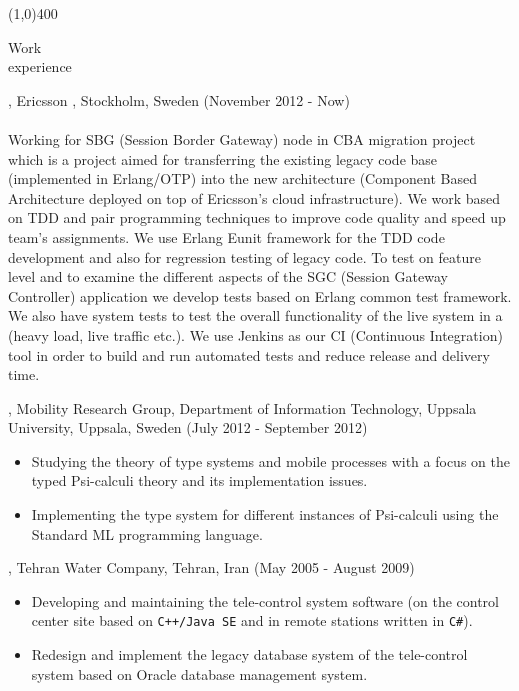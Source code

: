 \documentclass{resume}
\begin{document}
\begin{center}
\line(1,0){400}
\end{center}

\begin{category}{Work \\experience}

, Ericsson , Stockholm, Sweden (November 2012 - Now)\\ \\
Working for SBG (Session Border Gateway) node in CBA migration project which is a project 
aimed for transferring the existing legacy code base (implemented in Erlang/OTP) into the 
new architecture (Component Based Architecture deployed on top of Ericsson's cloud infrastructure). 
We work based on TDD and pair programming techniques to improve code quality and
speed up team's assignments. We use Erlang Eunit framework for the TDD code development and also
for regression testing of legacy code.
To test on feature level and to examine the different aspects of the SGC (Session Gateway Controller) 
application we develop tests based on Erlang common test framework. We 
also have system tests to test the overall functionality of the live system in a (heavy load, live traffic etc.). 
We use Jenkins as our CI (Continuous Integration) tool in order to build and run automated tests and  
reduce release and delivery time. 

, Mobility Research Group, Department of Information Technology, 
Uppsala University, Uppsala, Sweden (July 2012 - September 2012)\\ 
\begin{itemize}
 \item Studying the theory of type systems and mobile processes with a 
  focus on the typed Psi-calculi theory and its implementation issues.
 \item Implementing the type system for different instances of Psi-calculi 
  using the Standard ML programming language.
\end{itemize}

, Tehran Water Company, Tehran, Iran (May 2005 - August 2009)\\ 
\begin{itemize}
 \item Developing and maintaining the tele-control system software (on the control center site based 
  on \texttt{C++/Java SE} and in remote stations written in \texttt{C\#}).
 \item Redesign and implement the legacy database system of the tele-control system 
  based on Oracle database management system.
\end{itemize}


\end{category}
\end{document}
